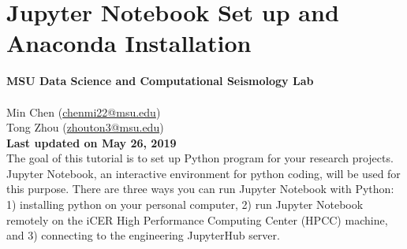\documentclass[12pt]{article}   	%
\begin{document}
\section*{Jupyter Notebook Set up and Anaconda Installation}

\textbf{MSU Data Science and Computational Seismology Lab}\\\\
Min Chen (\href{chenmi22@msu.edu}{chenmi22@msu.edu}) \\ 
Tong Zhou (\href{zhouton3@msu.edu}{zhouton3@msu.edu})\\ 
\textbf{Last updated on May 26, 2019} \\

The goal of this tutorial is to set up Python program for your research projects. Jupyter Notebook, an interactive environment for python coding, will be used for this purpose. 
There are three ways you can run Jupyter Notebook with Python: 1) installing python on your personal computer, 2) run Jupyter Notebook remotely on the iCER 
High Performance Computing Center (HPCC) machine, and 3) connecting to the engineering JupyterHub server.
\end{document}
